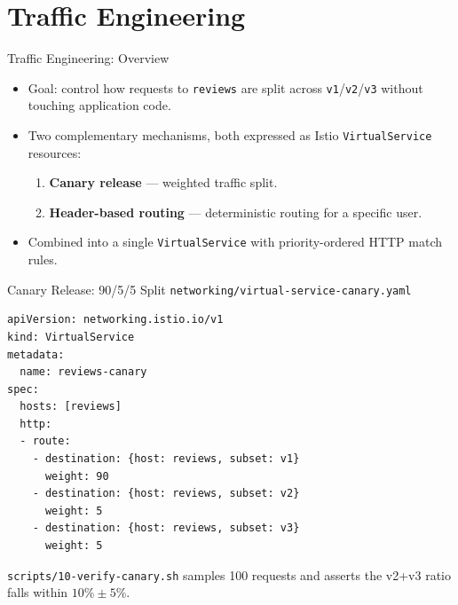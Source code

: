 \documentclass[aspectratio=169]{beamer}
\begin{document}
\section{Traffic Engineering}

\begin{frame}{Traffic Engineering: Overview}
  \begin{itemize}
    \item Goal: control how requests to \texttt{reviews} are split across \texttt{v1}/\texttt{v2}/\texttt{v3} without touching application code.
    \item Two complementary mechanisms, both expressed as Istio \texttt{VirtualService} resources:
    \begin{enumerate}
      \item \textbf{Canary release} --- weighted traffic split.
      \item \textbf{Header-based routing} --- deterministic routing for a specific user.
    \end{enumerate}
    \item Combined into a single \texttt{VirtualService} with priority-ordered HTTP match rules.
  \end{itemize}
\end{frame}

\begin{frame}[fragile]{Canary Release: 90/5/5 Split}
  \texttt{networking/virtual-service-canary.yaml}
  \begin{lstlisting}[style=yaml]
apiVersion: networking.istio.io/v1
kind: VirtualService
metadata:
  name: reviews-canary
spec:
  hosts: [reviews]
  http:
  - route:
    - destination: {host: reviews, subset: v1}
      weight: 90
    - destination: {host: reviews, subset: v2}
      weight: 5
    - destination: {host: reviews, subset: v3}
      weight: 5
  \end{lstlisting}
  \texttt{scripts/10-verify-canary.sh} samples 100 requests and asserts the
  v2+v3 ratio falls within $10\% \pm 5\%$.
\end{frame}
\end{document}
